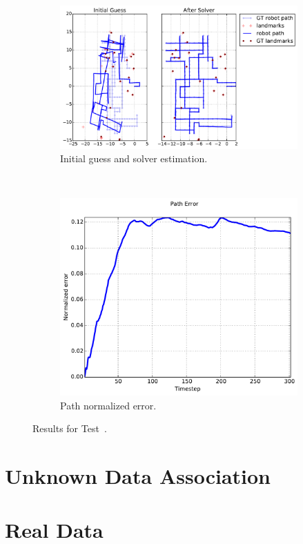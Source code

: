 \begin{test}
\begin{figure}[htbp!]
    \centering
    \begin{subfigure}[b]{0.8\textwidth}
        \includegraphics[width=\textwidth]{imagenes/tests/known/res_nl_40_op_1000_oa_1000_lp_1000_ds_300_nl_40_op_1000_oa_1000_lp_1000_ds_300.pdf}
        \caption{Initial guess and solver estimation.}
        \label{fig:test-ia}
    \end{subfigure}\\
    \begin{subfigure}[b]{0.6\textwidth}
        \includegraphics[width=\textwidth]{imagenes/tests/known/res_nl_40_op_1000_oa_1000_lp_1000_ds_300_nl_40_op_1000_oa_1000_lp_1000_ds_300_path.pdf}
        \caption{Path normalized error.}
        \label{fig:test-ib}
    \end{subfigure}
    \caption{Results for Test~.}
    \label{fig:test-i}
\end{figure}

\end{test}

\section{Unknown Data Association}
\label{sec:unknown-asso-res}

\section{Real Data}
\label{sec:real-data-res}